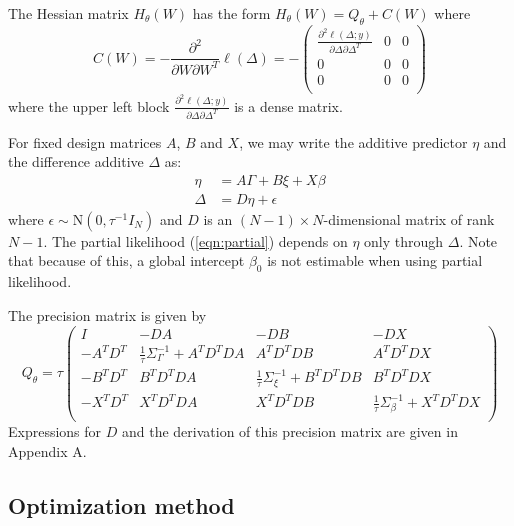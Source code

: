 \documentclass[ba]{imsart}
\begin{document}
The Hessian matrix $H_{\theta}(W)$ has the form $H_{\theta}(W) = Q_{\theta} + C(W)$ where
\begin{equation*}
C(W) = -\frac{\partial^{2}}{\partial W\partial W^{T}}\ell(\Delta) = -\begin{pmatrix}
\frac{\partial^{2}\ell(\Delta;y)}{\partial\Delta\partial\Delta^{T}} & 0 & 0 \\
0 & 0 & 0 \\
0 & 0 & 0 \\
\end{pmatrix}
\end{equation*}
where the upper left block $\frac{\partial^{2}\ell(\Delta;y)}{\partial\Delta\partial\Delta^{T}}$ is a dense matrix.

For fixed design matrices $A$, $B$ and $X$, we may write the additive predictor $\eta$ and the difference additive $\Delta$ as:
\begin{equation}\begin{aligned}
\eta &= A\Gamma + B\xi + X\beta \\
\Delta &= D\eta + \epsilon
\end{aligned}\end{equation}
where $\epsilon \sim \text{N}\left( 0,\tau^{-1}I_{N}\right)$ and $D$ is an $(N -1) \times N $-dimensional matrix of rank $N -1$. The partial likelihood (\ref{eqn:partial}) depends on $\eta$ only through $\Delta$. Note that because of this, a global intercept $\beta_{0}$ is not estimable when using partial likelihood. 

The precision matrix is given by
\begin{equation}\label{eqn:precmat}
Q_{\theta} = \tau\begin{pmatrix}
I & -DA & -DB & - DX \\
- A^{T}D^{T} & \frac{1}{\tau}\Sigma_{\Gamma}^{-1} +  A^{T}D^{T}DA &  A^{T}D^{T}DB &  A^{T}D^{T}DX \\
- B^{T}D^{T} &  B^{T}D^{T}DA & \frac{1}{\tau}\Sigma_{\xi}^{-1} +  B^{T}D^{T}DB & B^{T}D^{T}DX \\
- X^{T}D^{T} &  X^{T}D^{T}DA & X^{T}D^{T}DB & \frac{1}{\tau}\Sigma_{\beta}^{-1} +  X^{T}D^{T}DX \\
\end{pmatrix}
\end{equation}
Expressions for $D$ and the derivation of this precision matrix are given in Appendix A.

\subsection{Optimization method}\label{subsec:opt}
\end{document}

